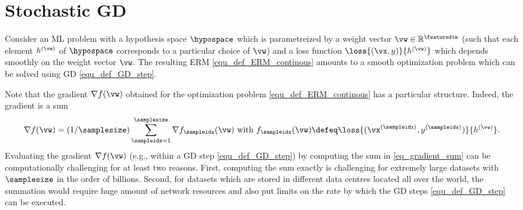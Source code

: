 \documentclass[12pt]{report}
\begin{document}
\begin{center}
\end{center}
 
 
\section{Stochastic GD}

Consider an ML problem with a hypothesis space $\hypospace$ which is parametreized by a 
weight vector $\vw \in \mathbb{R}^{\featuredim}$ (such that each element $h^{(\vw)}$ of $\hypospace$ 
corresponds to a particular choice of $\vw$) and a loss function $\loss{(\vx,y)}{h^{(\vw)}}$ which 
depends smoothly on the weight vector $\vw$. The resulting ERM \eqref{equ_def_ERM_continous} 
amounts to a smooth optimization problem which can be solved using GD \eqref{equ_def_GD_step}. 

Note that the gradient $\nabla f(\vw)$ obtained for the optimization problem \eqref{equ_def_ERM_continous} has a particular structure. 
Indeed, the gradient is a sum 
\vspace*{-2mm}
\begin{equation}
\label{eq_gradient_sum}
\nabla f(\vw) = (1/\samplesize) \sum_{\sampleidx=1}^{\samplesize} \nabla f_{\sampleidx}(\vw)   \mbox{ with } f_{\sampleidx}(\vw) \defeq \loss{(\vx^{(\sampleidx)},y^{(\sampleidx)})}{h^{(\vw)}}. 
\end{equation} 
Evaluating the gradient $\nabla f(\vw)$ (e.g., within a GD step \eqref{equ_def_GD_step}) by 
computing the sum in \eqref{eq_gradient_sum} can be computationally challenging for at least 
two reasons. First, computing the sum exactly is challenging for extremely large datasets with 
$\samplesize$ in the order of billions. Second, for datasets which are stored in different data 
centres located all over the world, the summation would require huge amount of network resources 
and also put limits on the rate by which the GD steps \eqref{equ_def_GD_step} can be executed. 
\begin{center}
\end{center}
\end{document}

